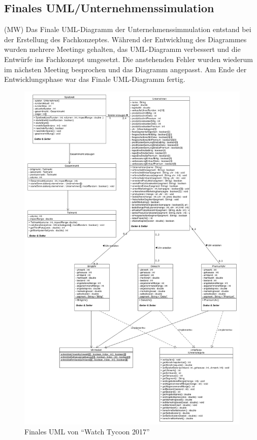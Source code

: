 \subsection{Finales UML/Unternehmenssimulation}
(MW) Das Finale UML-Diagramm der Unternehmenssimmulation entstand bei der Erstellung des Fachkonzeptes. Während der Entwicklung des Diagrammes wurden mehrere Meetings gehalten, das UML-Diagramm verbessert und die Entwürfe ins Fachkonzept umgesetzt. Die anstehenden Fehler wurden wiederum im nächsten Meeting besprochen und das Diagramm angepasst. Am Ende der Entwicklungsphase war das Finale UML-Diagramm fertig.
\begin{figure} [!h]
	\centering
	\includegraphics[scale=0.3]{img/Unternehmenssimmulation_final.png} 
	\caption{Finales UML von \enquote{Watch Tycoon 2017}} \label{fig:abb27}
\end{figure}

